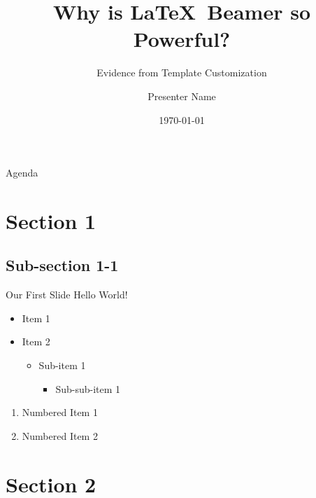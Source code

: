 \documentclass[aspectratio=169]{beamer}
\title[footer text]{Why is \LaTeX \ Beamer so Powerful?}
\subtitle{Evidence from Template Customization}
\author{Presenter Name}
\institute{Department of Banking and Finance, Monash Business School}
\date{\today}
\begin{document}
{
\begin{frame}[noframenumbering]
  \titlepage
\end{frame}
}

{
\begin{frame}[noframenumbering]{Agenda}
  \tableofcontents
\end{frame}
}

\section{Section 1}

\subsection{Sub-section 1-1}

\begin{frame}{Our First Slide}
  Hello World!
  \vspace{\baselineskip}
  \vspace{\baselineskip}

  \begin{itemize}
    \item Item 1
    \item Item 2
          \begin{itemize}
            \item Sub-item 1
                  \begin{itemize}
                    \item Sub-sub-item 1
                  \end{itemize}
          \end{itemize}
  \end{itemize}

  \begin{enumerate}
    \item Numbered Item 1
    \item Numbered Item 2
  \end{enumerate}
\end{frame}

\section{Section 2}
\end{document}
